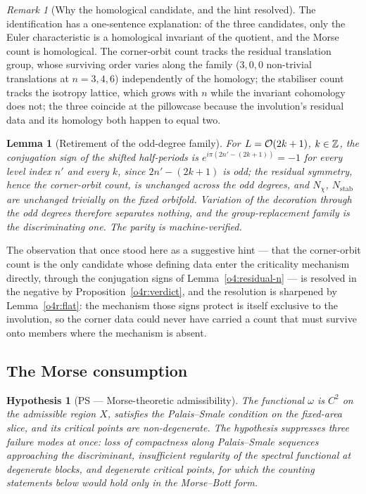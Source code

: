 \documentclass[11pt]{article}
\numberwithin{equation}{section}
\theoremstyle{plain}
\newtheorem{lemma}[theorem]{Lemma}
\newtheorem{hypothesis}[theorem]{Hypothesis}
\theoremstyle{definition}
\theoremstyle{remark}
\newtheorem{remark}[theorem]{Remark}
\begin{document}
\begin{remark}[Why the homological candidate, and the hint
resolved]\label{o4r:why}
The identification has a one-sentence explanation: of the three
candidates, only the Euler characteristic is a homological
invariant of the quotient, and the Morse count is homological. The
corner-orbit count tracks the residual translation group, whose
surviving order varies along the family ($3, 0, 0$ non-trivial
translations at $n = 3, 4, 6$) independently of the homology; the
stabiliser count tracks the isotropy lattice, which grows with $n$
while the invariant cohomology does not; the three coincide at the
pillowcase because the involution's residual data and its homology
both happen to equal two.
\end{remark}

\begin{lemma}[Retirement of the odd-degree family]\label{o4:odd}
For $L = \mathcal{O}(2k+1)$, $k \in \mathbb{Z}$, the conjugation sign of the
shifted half-periods is
$e^{i\pi(2n' - (2k+1))} = -1$ for every level index $n'$ and every
$k$, since $2n' - (2k+1)$ is odd; the residual symmetry, hence the
corner-orbit count, is unchanged across the odd degrees, and
$N_{\chi}$, $N_{\mathrm{stab}}$ are unchanged trivially on the
fixed orbifold. Variation of the decoration through the odd degrees
therefore separates nothing, and the group-replacement family is
the discriminating one. The parity is machine-verified.
\end{lemma}

The observation that once stood here as a suggestive hint --- that
the corner-orbit count is the only candidate whose defining data
enter the criticality mechanism directly, through the conjugation
signs of Lemma~\ref{o4:residual-n} --- is resolved in the negative
by Proposition~\ref{o4r:verdict}, and the resolution is sharpened
by Lemma~\ref{o4r:flat}: the mechanism those signs protect is
itself exclusive to the involution, so the corner data could never
have carried a count that must survive onto members where the
mechanism is absent.

\subsection{The Morse consumption}\label{sec:morse}

\begin{hypothesis}[PS --- Morse-theoretic
admissibility]\label{o2:ps}
The functional $\omega$ is $C^{2}$ on the admissible region $X$,
satisfies the Palais--Smale condition on the fixed-area slice, and
its critical points are non-degenerate. The hypothesis suppresses
three failure modes at once: loss of compactness along
Palais--Smale sequences approaching the discriminant, insufficient
regularity of the spectral functional at degenerate blocks, and
degenerate critical points, for which the counting statements below
would hold only in the Morse--Bott form.
\end{hypothesis}
\end{document}

